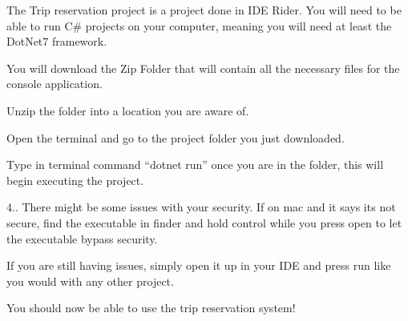 The Trip reservation project is a project done in IDE Rider. You will need to be able to run C\# projects on your computer, meaning you will need at least the Dot\+Net7 framework.


\begin{DoxyEnumerate}
\item You will download the Zip Folder that will contain all the necessary files for the console application.
\item Unzip the folder into a location you are aware of.
\item Open the terminal and go to the project folder you just downloaded.
\item Type in terminal command “dotnet run” once you are in the folder, this will begin executing the project.
\end{DoxyEnumerate}

4.. There might be some issues with your security. If on mac and it says its not secure, find the executable in finder and hold control while you press open to let the executable bypass security.


\begin{DoxyEnumerate}
\item If you are still having issues, simply open it up in your IDE and press run like you would with any other project.
\item You should now be able to use the trip reservation system! 
\end{DoxyEnumerate}
